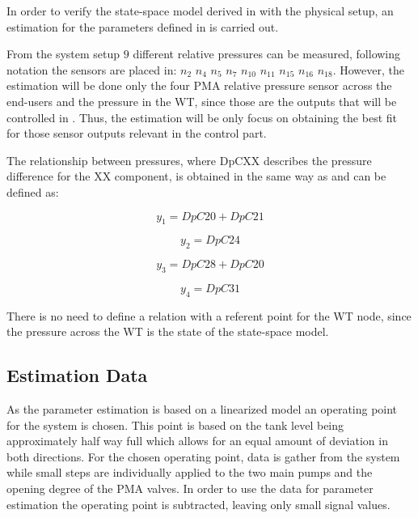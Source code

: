 In order to verify the state-space model derived in  with the physical setup, an estimation for the parameters defined in 
is carried out.

From the system setup $9$ different relative pressures can be measured, following  notation the sensors are placed in: 
$n_2$ $n_4$ $n_5$ $n_7$ $n_{10}$ $n_{11}$ $n_{15}$ $n_{16}$ $n_{18}$. However, the estimation will be done only the four PMA relative pressure 
sensor across the end-users and the pressure in the WT, since those are the outputs that will be controlled in . Thus, the estimation will be only focus on obtaining the best fit for those 
sensor outputs relevant in the control part. 

The relationship between pressures, where DpCXX describes the pressure difference for the XX component, is obtained in the same way as  and can be defined as:

\vspace{4mm}
\begin {equation}
     y_1 = DpC20 + DpC21  
\end{equation}

\vspace{4mm}
\begin {equation}
     y_2 = DpC24
\end{equation}


\vspace{4mm}
\begin {equation}
     y_3 = DpC28 + DpC20 
\end{equation}

\vspace{4mm}
\begin {equation}
     y_4 = DpC31 
\end{equation}

There is no need to define a relation with a referent point for the WT node, since the pressure across the WT is the state of the state-space model. 

\subsection{Estimation Data}

As the parameter estimation is based on a linearized model an operating point for the system is chosen. This point is based on the tank level being approximately half way full which allows for an equal amount of deviation in both directions. For the chosen operating point, data is gather from the system while small steps are individually applied to the two main pumps and the opening degree of the PMA valves. In order to use the data for parameter estimation the operating point is subtracted, leaving only small signal values.  

